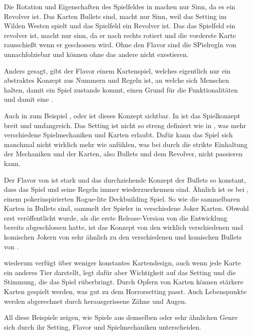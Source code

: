 Die Rotation und Eigenschaften des Spielfeldes in \FF machen nur Sinn, da es ein Revolver ist.
Das Karten Bullets sind, macht nur Sinn, weil das Setting im Wilden Westen spielt und das Spielfeld ein Revolver ist.
Das das Spielfeld ein revolver ist, macht nur sinn, da er nach rechts rotiert und die vorderste Karte rausschießt wenn er geschossen wird.
Ohne den Flavor sind die SPielregln von \FF unnachfolziebar und können ohne das andere nicht exestieren.


Anders gesagt, gibt der Flavor einem Kartenspiel, welches eigentlich nur ein abstraktes Konzept aus Nummern und Regeln ist,
an welche sich Menschen halten, damit ein Spiel zustande kommt, einen Grund für die Funktionalitäten und damit eine .


Auch in zum Beispiel ,  oder  ist dieses Konzept sichtbar. In 
ist das Spielkonzept breit und umfangreich.
Das Setting ist nicht so streng definiert wie in \FF, was mehr verschiedene Spielmechaniken und Karten erlaubt.
Dafür kann das Spiel sich manchmal nicht wirklich mehr wie  anfühlen,
was bei \FF durch die strikte Einhaltung der Mechaniken und der Karten, also Bullets und dem Revolver, nicht passieren kann.


Der Flavor von \FF ist stark und das durchziehende Konzept der Bullets so konstant, dass das Spiel und seine Regeln immer
wiederzuerkennen sind. Ähnlich ist es bei , einem pokerinspirierten Rogue-lite Deckbuilding Spiel.
So wie die sammelbaren Karten in \FF Bullets sind, sammelt der Spieler in  verschiedene Joker Karten.
Obwohl  erst veröffentlicht wurde, als die erste Release-Version von \FF die Entwicklung bereits abgeschlossen hatte,
ist das Konzept von den wirklich verschiedenen und komischen Jokern von  sehr ähnlich zu den verschiedenen und
komischen Bullets von \FF. 


 wiederum verfügt über weniger konstantes Kartendesign, auch wenn jede Karte ein anderes Tier darstellt,
legt dafür aber Wichtigkeit auf das Setting und die Stimmung, die das Spiel rüberbringt. Durch Opfern von Karten können stärkere Karten
gespielt werden, was gut zu dem Horrorsetting passt. Auch Lebenspunkte werden abgerechnet durch herausgerissene Zähne und Augen.


All diese Beispiele zeigen, wie Spiele aus demselben oder sehr ähnlichen Genre sich durch ihr Setting, Flavor und Spielmechaniken unterscheiden.



